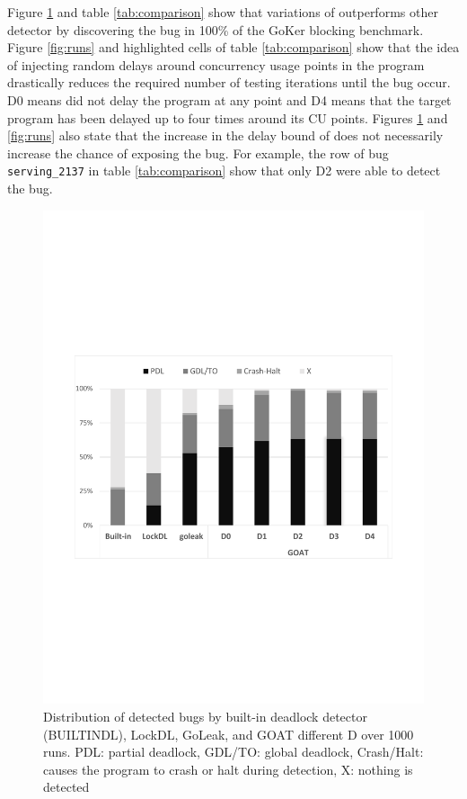 %
Figure \ref{fig:detection} and table \ref{tab:comparison} show that variations of \goat outperforms other detector by discovering the bug in 100\% of the GoKer blocking benchmark.
%
Figure \ref{fig:runs} and highlighted cells of table \ref{tab:comparison} show that the idea of injecting random delays around concurrency usage points in the program drastically reduces the required number of testing iterations until the bug occur.
%
D0 means \goat did not delay the program at any point and D4 means that the target program has been delayed up to four times around its CU points.
%
Figures \ref{fig:detection} and \ref{fig:runs} also state that the increase in the delay bound of \goat does not necessarily increase the chance of exposing the bug.
%
For example, the row of bug \texttt{serving\_2137} in table \ref{tab:comparison} show that only \goat D2 were able to detect the bug.

\begin{figure}
\centering
  \includegraphics[width=.95\linewidth]{figs/P4_detections.pdf}
  \caption{Distribution of detected bugs by built-in deadlock detector (BUILTINDL), LockDL, GoLeak, and GOAT different D over 1000 runs. PDL: partial deadlock, GDL/TO: global deadlock, Crash/Halt: causes the program to crash or halt during detection, X: nothing is detected }
  \label{fig:detection}
\end{figure}


